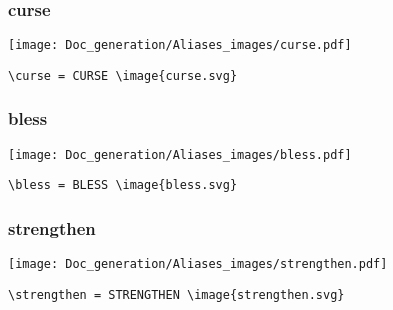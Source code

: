 \documentclass{article}
\begin{document}
\subsubsection{curse}
\begin{minipage}{0.45\linewidth}
\raggedright
\begin{spverbatim}
\curse 
\end{spverbatim}
\end{minipage}
\begin{minipage}{0.45\linewidth}
\raggedleft
\texttt{[image: Doc\_generation/Aliases\_images/curse.pdf]}
\end{minipage}
\begin{center}
\begin{BVerbatim}
\curse = CURSE \image{curse.svg}
\end{BVerbatim}
\end{center}

\subsubsection{bless}
\begin{minipage}{0.45\linewidth}
\raggedright
\begin{spverbatim}
\bless 
\end{spverbatim}
\end{minipage}
\begin{minipage}{0.45\linewidth}
\raggedleft
\texttt{[image: Doc\_generation/Aliases\_images/bless.pdf]}
\end{minipage}
\begin{center}
\begin{BVerbatim}
\bless = BLESS \image{bless.svg}
\end{BVerbatim}
\end{center}

\subsubsection{strengthen}
\begin{minipage}{0.45\linewidth}
\raggedright
\begin{spverbatim}
\strengthen 
\end{spverbatim}
\end{minipage}
\begin{minipage}{0.45\linewidth}
\raggedleft
\texttt{[image: Doc\_generation/Aliases\_images/strengthen.pdf]}
\end{minipage}
\begin{center}
\begin{BVerbatim}
\strengthen = STRENGTHEN \image{strengthen.svg}
\end{BVerbatim}
\end{center}
\end{document}
